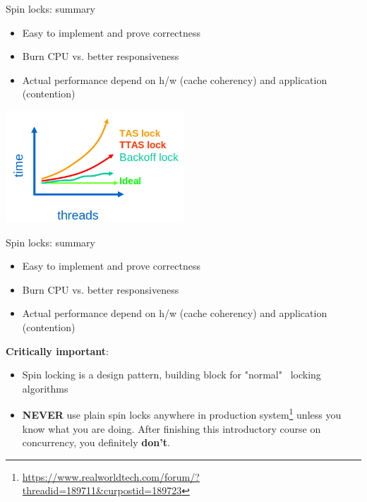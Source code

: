 \begin{frame}[t,fragile]{Spin locks: summary}


\begin{itemize}
  \item Easy to implement and prove correctness
  \item Burn CPU vs. better responsiveness
  \item Actual performance depend on h/w (cache coherency) and application (contention)
\end{itemize}

\pause

\begin{center} \includegraphics[width=0.5\textwidth]{./pics/locks.png} 
\end{center} 

\end{frame}


\begin{frame}{Spin locks: summary}

\begin{itemize}
  \item Easy to implement and prove correctness
  \item Burn CPU vs. better responsiveness
  \item Actual performance depend on h/w (cache coherency) and application (contention)
\end{itemize}

\textbf{Critically important}:
\begin{itemize}
  \pause
  \item Spin locking is a design pattern, building block for "normal" \ locking algorithms
  \pause
  \item \textbf{NEVER} use plain spin locks anywhere in production system\footnote<3->{\tiny\url{https://www.realworldtech.com/forum/?threadid=189711&curpostid=189723}} \pause unless you know what you are doing. \pause After finishing this introductory course on concurrency, you definitely \textbf{don't}.
\end{itemize}


\end{frame}



